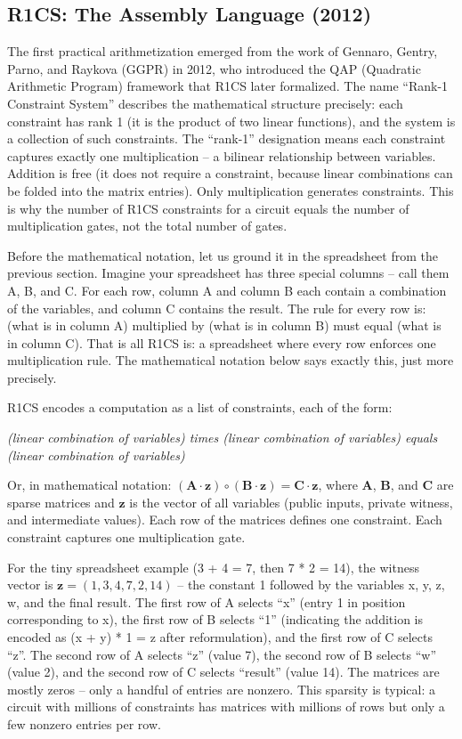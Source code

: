\documentclass[
  11pt,
  openany]{report}
\begin{document}
\subsection{R1CS: The Assembly Language
(2012)}\label{r1cs-the-assembly-language-2012}

The first practical arithmetization emerged from the work of Gennaro, Gentry,
Parno, and Raykova (GGPR) in 2012, who introduced the QAP (Quadratic Arithmetic
Program) framework that R1CS later formalized. The name ``Rank-1 Constraint
System'' describes the mathematical structure precisely: each constraint has
rank 1 (it is the product of two linear functions), and the system is a
collection of such constraints. The ``rank-1'' designation means each constraint
captures exactly one multiplication -- a bilinear relationship between
variables. Addition is free (it does not require a constraint, because linear
combinations can be folded into the matrix entries). Only multiplication
generates constraints. This is why the number of R1CS constraints for a circuit
equals the number of multiplication gates, not the total number of gates.

Before the mathematical notation, let us ground it in the spreadsheet from the
previous section. Imagine your spreadsheet has three special columns -- call
them A, B, and C. For each row, column A and column B each contain a combination
of the variables, and column C contains the result. The rule for every row is:
(what is in column A) multiplied by (what is in column B) must equal (what is in
column C). That is all R1CS is: a spreadsheet where every row enforces one
multiplication rule. The mathematical notation below says exactly this, just
more precisely.

R1CS encodes a computation as a list of constraints, each of the form:

\emph{(linear combination of variables) times (linear combination of variables)
equals (linear combination of variables)}

Or, in mathematical notation:
\((\mathbf{A} \cdot \mathbf{z}) \circ (\mathbf{B} \cdot \mathbf{z}) = \mathbf{C} \cdot \mathbf{z}\),
where \(\mathbf{A}\), \(\mathbf{B}\), and \(\mathbf{C}\) are sparse matrices and
\(\mathbf{z}\) is the vector of all variables (public inputs, private witness,
and intermediate values). Each row of the matrices defines one constraint. Each
constraint captures one multiplication gate.

For the tiny spreadsheet example (3 + 4 = 7, then 7 * 2 = 14), the witness
vector is \(\mathbf{z} = (1, 3, 4, 7, 2, 14)\) -- the constant 1 followed by the
variables x, y, z, w, and the final result. The first row of A selects ``x''
(entry 1 in position corresponding to x), the first row of B selects ``1''
(indicating the addition is encoded as (x + y) * 1 = z after reformulation), and
the first row of C selects ``z''. The second row of A selects ``z'' (value 7),
the second row of B selects ``w'' (value 2), and the second row of C selects
``result'' (value 14). The matrices are mostly zeros -- only a handful of
entries are nonzero. This sparsity is typical: a circuit with millions of
constraints has matrices with millions of rows but only a few nonzero entries
per row.
\end{document}
